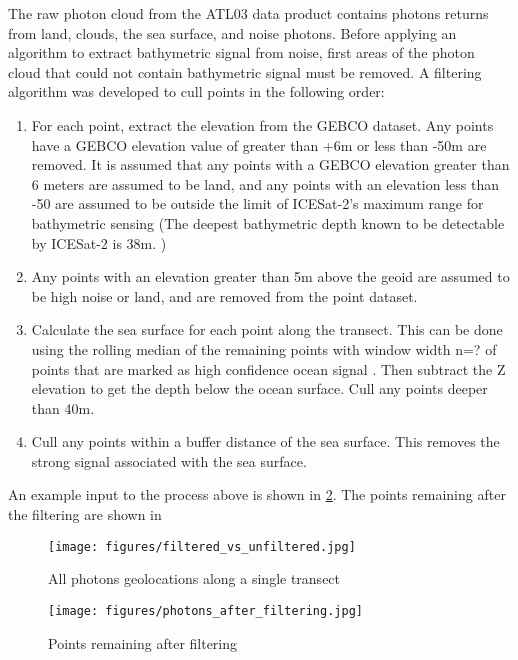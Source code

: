 The raw photon cloud from the ATL03 data product contains photons returns from land, clouds, the sea surface, and noise photons. Before applying an algorithm to extract bathymetric signal from noise, first areas of the photon cloud that could not contain bathymetric signal must be removed. A filtering algorithm was developed to cull points in the following order:

\begin{enumerate}
    \item For each point, extract the elevation from the GEBCO dataset. Any points have a GEBCO elevation value of greater than +6m or less than -50m are removed. It is assumed that any points with a GEBCO elevation greater than 6 meters are assumed to be land, and any points with an elevation less than -50 are assumed to be outside the limit of ICESat-2's maximum range for bathymetric sensing (The deepest bathymetric depth known to be detectable by ICESat-2 is 38m. \parencite{Parrish2019})
    
    \item Any points with an elevation greater than 5m above the geoid are assumed to be high noise or land, and are removed from the point dataset.

    \item Calculate the sea surface for each point along the transect. This can be done using the rolling median of the remaining points with window width n=? of points that are marked as high confidence ocean signal \parencite{Ranndal2021}. Then subtract the Z elevation to get the depth below the ocean surface.  Cull any points deeper than 40m. 
    \item Cull any points within a buffer distance of the sea surface. This removes the strong signal associated with the sea surface.
\end{enumerate}

An example input to the process above is shown in \ref{fig:filtering_results}. The points remaining after the filtering are shown in 

\begin{figure}[h!]
    \centering
    \texttt{[image: figures/filtered\_vs\_unfiltered.jpg]}
    \caption{All photons geolocations along a single transect}
    \label{fig:filtering_results}
\end{figure}

\begin{figure}[h!]
    \centering
    \texttt{[image: figures/photons\_after\_filtering.jpg]}
    \caption{Points remaining after filtering}
    \label{fig:filtering_results}
\end{figure}

